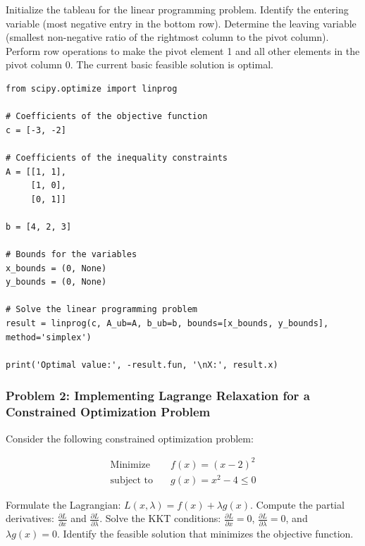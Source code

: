 \documentclass[12pt]{book} %
\begin{document}
\begin{algorithm}
\caption{Simplex Method}
\begin{algorithmic}[1]
\State Initialize the tableau for the linear programming problem.
    \State Identify the entering variable (most negative entry in the bottom row).
    \State Determine the leaving variable (smallest non-negative ratio of the rightmost column to the pivot column).
    \State Perform row operations to make the pivot element 1 and all other elements in the pivot column 0.
\EndWhile
\State The current basic feasible solution is optimal.
\end{algorithmic}
\end{algorithm}

\FloatBarrier

\begin{lstlisting}
from scipy.optimize import linprog

# Coefficients of the objective function
c = [-3, -2]

# Coefficients of the inequality constraints
A = [[1, 1],
     [1, 0],
     [0, 1]]

b = [4, 2, 3]

# Bounds for the variables
x_bounds = (0, None)
y_bounds = (0, None)

# Solve the linear programming problem
result = linprog(c, A_ub=A, b_ub=b, bounds=[x_bounds, y_bounds], method='simplex')

print('Optimal value:', -result.fun, '\nX:', result.x)
\end{lstlisting}

\FloatBarrier

\subsubsection*{Problem 2: Implementing Lagrange Relaxation for a Constrained Optimization Problem}
Consider the following constrained optimization problem:

\begin{align*}
\text{Minimize} \quad & f(x) = (x-2)^2 \\
\text{subject to} \quad & g(x) = x^2 - 4 \leq 0
\end{align*}


\begin{algorithm}
\caption{Lagrange Relaxation}
\begin{algorithmic}[1]
\State Formulate the Lagrangian: $L(x, \lambda) = f(x) + \lambda g(x)$.
\State Compute the partial derivatives: $\frac{\partial L}{\partial x}$ and $\frac{\partial L}{\partial \lambda}$.
\State Solve the KKT conditions: $\frac{\partial L}{\partial x} = 0$, $\frac{\partial L}{\partial \lambda} = 0$, and $\lambda g(x) = 0$.
\State Identify the feasible solution that minimizes the objective function.
\end{algorithmic}
\end{algorithm}
\end{document}
